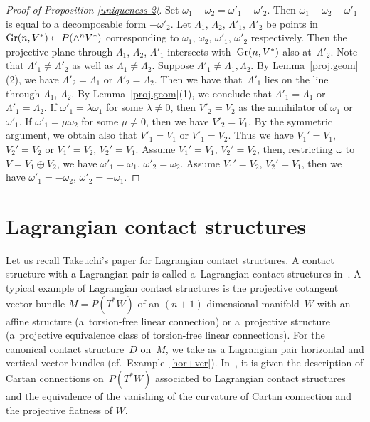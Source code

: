 \documentclass[11pt]{article}
\begin{document}
\begin{proof}[Proof of Proposition \ref{uniqueness 2}]
Set $\omega_1 - \omega_2 = \omega'_1 - \omega'_2$. Then
$\omega_1 - \omega_2 - \omega'_1$ is equal to a decomposable form
$- \omega'_2$.
Let $\Lambda_1$, $\Lambda_2$, $\Lambda'_1$, $\Lambda'_2$ be
points in ${\rm Gr}(n, V^*) \subset P(\wedge^n V^*)$
corresponding to $\omega_1$, $\omega_2$, $\omega'_1$, $\omega'_2$ respectively.
Then the projective plane through $\Lambda_1$, $\Lambda_2$, $\Lambda'_1$
intersects with~${\rm Gr}(n, V^*)$ also at~$\Lambda'_2$.
Note that $\Lambda'_1 \not= \Lambda'_2$ as well as
$\Lambda_1 \not= \Lambda_2$.
Suppose $\Lambda'_1 \not= \Lambda_1, \Lambda_2$.
By Lemma~\ref{proj.geom}(2), we have
$\Lambda'_2 = \Lambda_1$ or $\Lambda'_2 = \Lambda_2$.
Then we have that~$\Lambda'_1$ lies on the line through $\Lambda_1$, $\Lambda_2$.
By Lemma~\ref{proj.geom}(1), we conclude that
$\Lambda'_1 = \Lambda_1$ or $\Lambda'_1 = \Lambda_2$.
If $\omega'_1 = \lambda\omega_1$ for some $\lambda \not= 0$,
then $V'_2 = V_2$ as the annihilator of $\omega_1$ or $\omega'_1$.
If $\omega'_1 = \mu\omega_2$ for some $\mu \not= 0$,
then we have $V'_2 = V_1$.
By the symmetric argument, we obtain also that $V'_1 = V_1$ or $V'_1 = V_2$.
Thus we have $V_1' = V_1$, $V_2' = V_2$ or
$V_1' = V_2$,  $V_2' = V_1$.
Assume $V_1' = V_1$, $V_2' = V_2$, then,
restricting $\omega$ to $V = V_1 \oplus V_2$, we have
$\omega'_1 = \omega_1$, $\omega'_2 = \omega_2$.
Assume $V_1' = V_2$,  $V_2' = V_1$,
then we have $\omega'_1 = -\omega_2$, $\omega'_2 = - \omega_1$.
\end{proof}
\setcounter{section}{3}
\setcounter{subsection}{0}
\setcounter{subsubsection}{0}
\setcounter{Th}{11}
\setcounter{equation}{0}
\section{Lagrangian contact structures}
\label{Lagrangian contact structures.}

Let us recall Takeuchi's paper \cite{Tak} for Lagrangian contact structures.
A contact structure with a Lagrangian pair is called a~Lagrangian contact structures in~\cite{Tak}.
A typical example of Lagrangian contact structures
is the projective cotangent vector bundle
$M = P(T^*W)$ of an $(n+1)$-dimensional manifold~$W$
with an af\/f\/ine structure (a~torsion-free linear connection) or
a~projective structure
(a~projective equivalence class of torsion-free linear connections).
For the canonical contact structure~$D$ on~$M$,
we take as a Lagrangian pair horizontal and vertical vector bundles
(cf.\ Example~\ref{hor+ver}).
In~\cite{Tak}, it is given the description of Cartan connections on~$P(T^*W)$
associated to Lagrangian contact structures and the equivalence of the vanishing
of the curvature of Cartan connection and the projective f\/latness of $W$.
\end{document}
